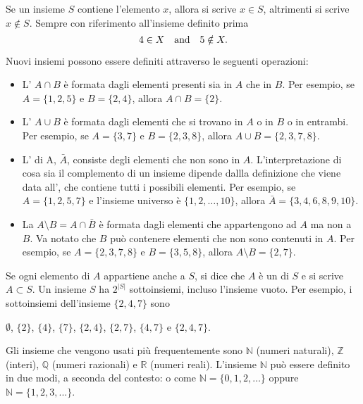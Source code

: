 Se un insieme $S$ contiene l'elemento $x$, 
allora si scrive $x \in S$, 
altrimenti si scrive $x \notin S$.
Sempre con riferimento all'insieme definito prima
\[4 \in X \hspace{10px}\textrm{and}\hspace{10px} 5 \notin X.\]

\begin{samepage}
Nuovi insiemi possono essere definiti attraverso le seguenti operazioni:
\begin{itemize}
\item L' $A \cap B$ è formata dagli elementi
presenti sia in $A$ che in $B$.
Per esempio, se $A=\{1,2,5\}$ e $B=\{2,4\}$,
allora $A \cap B = \{2\}$.
\item L' $A \cup B$ è formata dagli elementi che
si trovano in $A$ o in $B$ o in entrambi.
Per esempio, se $A=\{3,7\}$ e $B=\{2,3,8\}$,
allora $A \cup B = \{2,3,7,8\}$.
\item L' di A, $\bar A$,  consiste degli elementi
che non sono in $A$.
L'interpretazione di cosa sia il complemento di un insieme dipende
dallla definizione che viene data all', che contiene tutti i possibili elementi.
Per esempio, se $A=\{1,2,5,7\}$ e l'insieme universo è
$\{1,2,\ldots,10\}$, allora $\bar A = \{3,4,6,8,9,10\}$.
\item La  $A \setminus B = A \cap \bar B$
è formata dagli elementi che appartengono ad $A$ ma non a $B$.
Va notato che $B$ può contenere elementi che non sono contenuti in $A$.
Per esempio, se $A=\{2,3,7,8\}$ e $B=\{3,5,8\}$,
allora $A \setminus B = \{2,7\}$.
\end{itemize}
\end{samepage}

Se ogni elemento di $A$ appartiene anche a $S$,
si dice che $A$ è un  di $S$
e si scrive $A \subset S$.
Un insieme $S$ ha $2^{|S|}$ sottoinsiemi,
incluso l'insieme vuoto.
Per esempio, i sottoinsiemi dell'insieme $\{2,4,7\}$ sono
\begin{center}
$\emptyset$,
$\{2\}$, $\{4\}$, $\{7\}$, $\{2,4\}$, $\{2,7\}$, $\{4,7\}$ e $\{2,4,7\}$.
\end{center}

Gli insieme che vengono usati più frequentemente sono
$\mathbb{N}$ (numeri naturali),
$\mathbb{Z}$ (interi),
$\mathbb{Q}$ (numeri razionali) e
$\mathbb{R}$ (numeri reali).
L'insieme $\mathbb{N}$
può essere definito in due modi, a seconda del contesto:
o come $\mathbb{N}=\{0,1,2,\ldots\}$
oppure $\mathbb{N}=\{1,2,3,...\}$.

